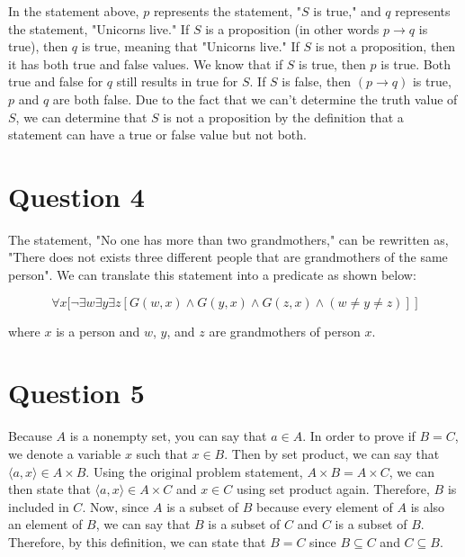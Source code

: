 \documentclass[11pt]{article}
\begin{document}
In the statement above, $p$ represents the statement, "$S$ is true," and $q$ represents the statement, "Unicorns live." If $S$ is a proposition (in other words $p \to q$ is true), then $q$ is true, meaning that "Unicorns live." If $S$ is not a proposition, then it has both true and false values. We know that if $S$ is true, then $p$ is true. Both true and false for $q$ still results in true for $S$. If $S$ is false, then $(p \to q)$ is true, $p$ and $q$ are both false. Due to the fact that we can't determine the truth value of $S$, we can determine that $S$ is not a proposition by the definition that a statement can have a true or false value but not both.

\section*{Question 4}
The statement, "No one has more than two grandmothers," can be rewritten as, "There does not exists three different people that are grandmothers of the same person". We can translate this statement into a predicate as shown below:

\[
\forall x \Bigg[ \neg \exists w \exists y \exists z [ G(w,x) \wedge G(y,x) \wedge G(z,x) \wedge (w \neq y \neq z)] \> \Bigg]
\]

where $x$ is a person and $w$, $y$, and $z$ are grandmothers of person $x$.

\section*{Question 5}
Because $A$ is a nonempty set, you can say that $a \in A$. In order to prove if $B = C$, we denote a variable $x$ such that $x \in B$. Then by set product, we can say that $\langle a,x \rangle \in A \times B$. Using the original problem statement, $A \times B = A \times C$, we can then state that $\langle a,x \rangle \in A \times C$ and $x \in C$ using set product again. Therefore, $B$ is included in $C$. Now, since $A$ is a subset of $B$ because every element of $A$ is also an element of $B$, we can say that $B$ is a subset of $C$ and $C$ is a subset of $B$. Therefore, by this definition, we can state that $B = C$ since $B \subseteq C$ and $C \subseteq B$.
\end{document}
